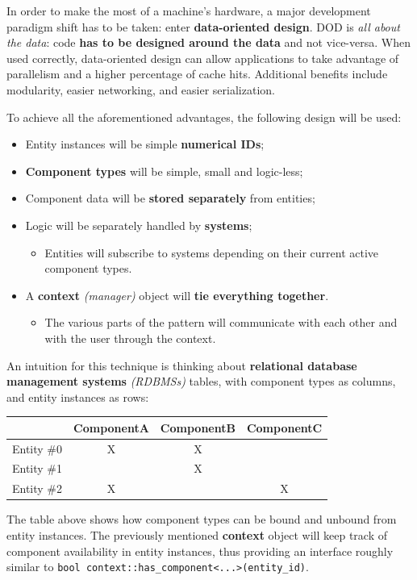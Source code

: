 \documentclass[twoside, 12pt, a4paper, openright]{book}
\providecommand{\tightlist}{%
  \setlength{\itemsep}{0pt}\setlength{\parskip}{0pt}}
\begin{document}
In order to make the most of a machine's hardware, a major development
paradigm shift has to be taken: enter \textbf{data-oriented design}. DOD
is \emph{all about the data}: code \textbf{has to be designed around the
data} and not vice-versa. When used correctly, data-oriented design can
allow applications to take advantage of parallelism and a higher
percentage of cache hits. Additional benefits include modularity, easier
networking, and easier serialization.

To achieve all the aforementioned advantages, the following design will
be used:

\begin{itemize}
\item
  Entity instances will be simple \textbf{numerical IDs};
\item
  \textbf{Component types} will be simple, small and logic-less;
\item
  Component data will be \textbf{stored separately} from entities;
\item
  Logic will be separately handled by \textbf{systems};

  \begin{itemize}
  \tightlist
  \item
    Entities will subscribe to systems depending on their current active
    component types.
  \end{itemize}
\item
  A \textbf{context} \emph{(manager)} object will \textbf{tie everything
  together}.

  \begin{itemize}
  \tightlist
  \item
    The various parts of the pattern will communicate with each other
    and with the user through the context.
  \end{itemize}
\end{itemize}

An intuition for this technique is thinking about \textbf{relational
database management systems} \emph{(RDBMSs)} tables, with component
types as columns, and entity instances as rows:

\begin{longtable}[]{@{}lccc@{}}
\toprule
& ComponentA & ComponentB & ComponentC\tabularnewline
\midrule
\endhead
Entity \#0 & X & X &\tabularnewline
Entity \#1 & & X &\tabularnewline
Entity \#2 & X & & X\tabularnewline
\bottomrule
\end{longtable}

The table above shows how component types can be bound and unbound from
entity instances. The previously mentioned \textbf{context} object will
keep track of component availability in entity instances, thus providing
an interface roughly similar to
\texttt{bool context::has_component<...>(entity_id)}.
\end{document}
